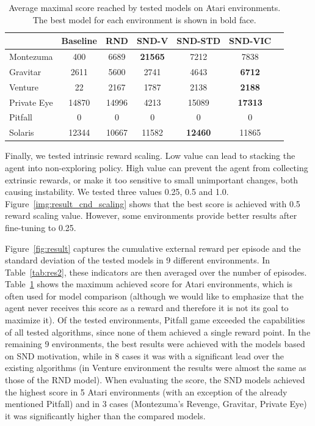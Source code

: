\documentclass[a4paper,11pt]{elsarticle}
\begin{document}
\begin{table}[thb]
\scriptsize
\centering
\caption{Average maximal score reached by tested models on Atari environments. The best model for each environment is shown in bold face.}
\begin{tabular}{l|cccccc}
\hline
 & Baseline & RND & SND-V & SND-STD & SND-VIC \\
\hline\hline
Montezuma & 400 & 6689 & \textbf{21565} & 7212 & 7838 \\
Gravitar & 2611 & 5600 & 2741 & 4643 & \textbf{6712} \\
Venture & 22 & 2167 & 1787 & 2138 & \textbf{2188}  \\ 
Private Eye & 14870 & 14996 & 4213 & 15089 & \textbf{17313} \\ 
Pitfall & 0 & 0 & 0 & 0 & 0 \\ 
Solaris & 12344 & 10667 & 11582 & \textbf{12460} & 11865 \\ 
\hline
\end{tabular}
\label{tab:res3}
\end{table}

Finally, we tested intrinsic reward scaling. Low value can lead to stacking the agent into non-exploring policy. High value can prevent the agent from collecting extrinsic rewards, or make it too sensitive to small unimportant changes, both causing instability. We tested three values 0.25, 0.5 and 1.0. Figure~\ref{img:result_cnd_scaling} shows that the best score is achieved with 0.5 reward scaling value. However, some environments provide better results after fine-tuning to 0.25.

Figure~\ref{fig:result} captures the cumulative external reward per episode and the standard deviation of the tested models in 9 different environments. In Table~\ref{tab:res2}, these indicators are then averaged over the number of episodes. Table~\ref{tab:res3} shows the maximum achieved score for Atari environments, which is often used for model comparison (although we would like to emphasize that the agent never receives this score as a reward and therefore it is not its goal to maximize it).
Of the tested environments, Pitfall game exceeded the capabilities of all tested algorithms, since none of them achieved a single reward point. In the remaining 9 environments, the best results were achieved with the models based on SND motivation, while in 8 cases it was with a significant lead over the existing algorithms (in Venture environment the results were almost the same as those of the RND model). When evaluating the score, the SND models achieved the highest score in 5 Atari environments (with an exception of the already mentioned Pitfall) and in 3 cases (Montezuma's Revenge, Gravitar, Private Eye) it was significantly higher than the compared models.
\end{document}
